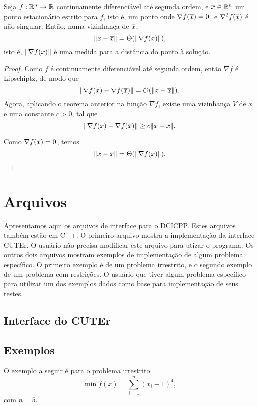 \begin{corollary}
Seja $f:\mathbb{R}^{n}\rightarrow\mathbb{R}$ continuamente diferenciável até
segunda ordem, e $\overline{x} \in \mathbb{R}^{n}$ um ponto estacionário
estrito para $f$,
isto é, um ponto onde $\nabla f(\overline{x}) = 0$, e
$\nabla^2 f(\overline{x})$ é não-singular.
Então, numa vizinhança de $\overline{x}$, 
$$\Vert x - \overline{x}\Vert = \Theta(\Vert \nabla f(x)\Vert),$$
isto é, $\Vert \nabla f(x)\Vert$ é uma medida para a distância do
ponto à solução.
\end{corollary}
\begin{proof}
  Como $f$ é continuamente diferenciável até segunda ordem,
  então $\nabla f$ é Lipschiptz, de modo que
  $$\Vert \nabla f(x) - \nabla f(\overline{x})\Vert = 
      \mathcal{O}(\Vert x - \overline{x}\Vert).$$
  Agora, aplicando o teorema anterior na função $\nabla f$,
  existe uma vizinhança $V$ de $x$ e uma constante $c > 0$,
  tal que
  $$\Vert \nabla f(x) - \nabla f(\overline{x})\Vert \geq
      c\Vert x - \overline{x}\Vert.$$

  Como $\nabla f(\overline{x}) = 0$, temos
    $$\Vert x - \overline{x}\Vert = \Theta(\Vert \nabla f(x)\Vert).$$
\end{proof}

\chapter{Arquivos}

Apresentamos aqui os arquivos de interface para o DCICPP. Estes arquivos também
estão em C++.
O primeiro arquivo mostra a implementação da interface CUTEr. O usuário não
precisa modificar este arquivo para utizar o programa.
Os outros dois arquivos mostram exemplos de implementação de algum problema
específico. O primeiro exemplo é de um problema irrestrito, e o segundo exemplo
de um problema com restrições. O usuário que tiver algum problema específico
para utilizar um dos exemplos dados como base para implementação de seus testes.

\lstset{basicstyle=\footnotesize\ttfamily, breaklines=true, frame=single,
language=C++, keepspaces=true, title=\lstname}

\section{Interface do CUTEr}



\section{Exemplos}
O exemplo a seguir é para o problema irrestrito
$$ \min f(x) = \sum_{i = 1}^n (x_i - 1)^4, $$
com $n = 5$. 


